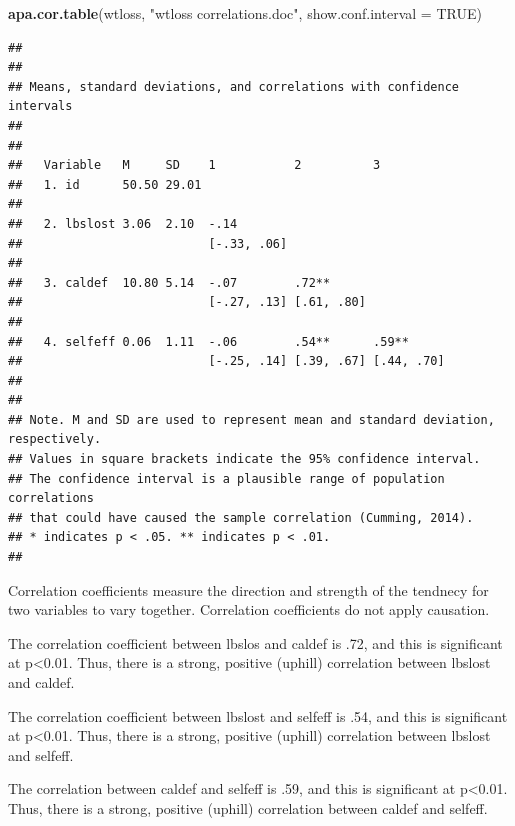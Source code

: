 \documentclass[]{article}
\newenvironment{Shaded}{\begin{snugshade}}{\end{snugshade}}
\newcommand{\KeywordTok}[1]{\textcolor[rgb]{0.13,0.29,0.53}{\textbf{#1}}}
\newcommand{\DataTypeTok}[1]{\textcolor[rgb]{0.13,0.29,0.53}{#1}}
\newcommand{\StringTok}[1]{\textcolor[rgb]{0.31,0.60,0.02}{#1}}
\newcommand{\OtherTok}[1]{\textcolor[rgb]{0.56,0.35,0.01}{#1}}
\newcommand{\NormalTok}[1]{#1}
\begin{document}
\begin{Shaded}
\begin{Highlighting}[]
\KeywordTok{apa.cor.table}\NormalTok{(wtloss, }\StringTok{"wtloss correlations.doc"}\NormalTok{, }\DataTypeTok{show.conf.interval =} \OtherTok{TRUE}\NormalTok{)}
\end{Highlighting}
\end{Shaded}

\begin{verbatim}
## 
## 
## Means, standard deviations, and correlations with confidence intervals
##  
## 
##   Variable   M     SD    1           2          3         
##   1. id      50.50 29.01                                  
##                                                           
##   2. lbslost 3.06  2.10  -.14                             
##                          [-.33, .06]                      
##                                                           
##   3. caldef  10.80 5.14  -.07        .72**                
##                          [-.27, .13] [.61, .80]           
##                                                           
##   4. selfeff 0.06  1.11  -.06        .54**      .59**     
##                          [-.25, .14] [.39, .67] [.44, .70]
##                                                           
## 
## Note. M and SD are used to represent mean and standard deviation, respectively.
## Values in square brackets indicate the 95% confidence interval.
## The confidence interval is a plausible range of population correlations 
## that could have caused the sample correlation (Cumming, 2014).
## * indicates p < .05. ** indicates p < .01.
## 
\end{verbatim}

Correlation coefficients measure the direction and strength of the
tendnecy for two variables to vary together. Correlation coefficients do
not apply causation.

The correlation coefficient between lbslos and caldef is .72, and this
is significant at p\textless{}0.01. Thus, there is a strong, positive
(uphill) correlation between lbslost and caldef.

The correlation coefficient between lbslost and selfeff is .54, and this
is significant at p\textless{}0.01. Thus, there is a strong, positive
(uphill) correlation between lbslost and selfeff.

The correlation between caldef and selfeff is .59, and this is
significant at p\textless{}0.01. Thus, there is a strong, positive
(uphill) correlation between caldef and selfeff.
\end{document}
